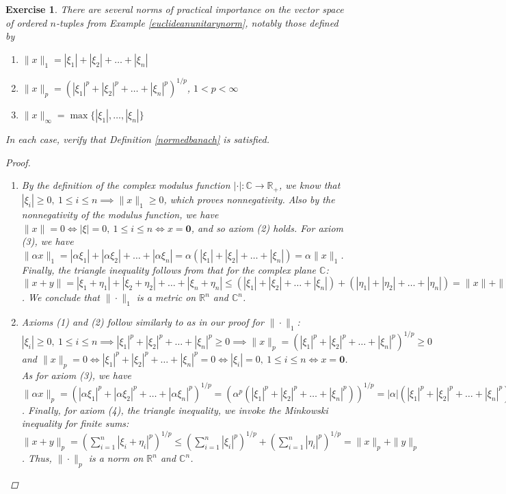 \documentclass[11pt]{article}
\theoremstyle{mystyle}
\newtheorem{protoexer}{Exercise}[section]
\newenvironment{exer}
{\colorlet{shadecolor}{blue!15}\begin{shaded}\begin{protoexer}}
{\end{protoexer}\end{shaded}}
\newcommand{\0}{\mathbf{0}}
\begin{document}
\begin{exer}\label{euclideannorms}
There are several norms of practical importance on the vector space of ordered $n$-tuples from Example \ref{euclideanunitarynorm}, notably those defined by
\begin{enumerate}
    \item $\|x\|_1 = |\xi_1| + |\xi_2| + \ldots + |\xi_n|$
    \item $\|x\|_p = (|\xi_1|^p + |\xi_2|^p + \ldots + |\xi_n|^p)^{1/p}$, \quad $1 < p < \infty$
    \item $\|x\|_{\infty} = \max\{|\xi_1|, \ldots, |\xi_n| \}$
\end{enumerate}
In each case, verify that Definition \ref{normedbanach} is satisfied.
\begin{proof}
\begin{enumerate}
    \item By the definition of the complex modulus function $| \cdot |: \mathbb{C} \longrightarrow \mathbb{R}_+$, we know that $|\xi_i| \geq 0, \ 1 \leq i \leq n \implies \| x\|_1 \geq 0$, which proves nonnegativity. Also by the nonnegativity of the modulus function, we have $\| x \| = 0 \iff  | \xi | = 0, \ 1 \leq i \leq n \iff x = \0$, and so axiom (2) holds. For axiom (3), we have $\| \alpha x \|_1 = |\alpha \xi_1| + |\alpha \xi_2| + \ldots + |\alpha \xi_n| = \alpha (|\xi_1| + |\xi_2| + \ldots + |\xi_n|) = \alpha \| x \|_1$. Finally, the triangle inequality follows from that for the complex plane $\mathbb{C}$: $\| x + y \| = |\xi_1 + \eta_1| + |\xi_2 + \eta_2| + \ldots + |\xi_n + \eta_n| \leq (|\xi_1| + |\xi_2| + \ldots + |\xi_n|) + (|\eta_1| + |\eta_2| + \ldots + |\eta_n|) = \|x\| + \|y\|$. We conclude that $\|\cdot\|_1$ is a metric on $\mathbb{R}^n$ and $\mathbb{C}^n$.
    \item Axioms (1) and (2) follow similarly to as in our proof for $\| \cdot \|_1$: $|\xi_i| \geq 0, \ 1 \leq i \leq n \implies |\xi_1|^p + |\xi_2|^p + \ldots + |\xi_n|^p \geq 0 \implies \|x\|_p = (|\xi_1|^p + |\xi_2|^p + \ldots + |\xi_n|^p)^{1/p} \geq 0$ and $\|x\|_p = 0 \iff |\xi_1|^p + |\xi_2|^p + \ldots + |\xi_n|^p = 0 \iff |\xi_i| = 0, \ 1 \leq i \leq n \iff x = \0$. As for axiom (3), we have $\| \alpha x \|_p = (| \alpha \xi_1|^p + | \alpha \xi_2|^p + \ldots + |\alpha \xi_n|^p)^{1/p} = (\alpha^p(|\xi_1|^p + |\xi_2|^p + \ldots + |\xi_n|^p))^{1/p} = |\alpha|(|\xi_1|^p + |\xi_2|^p + \ldots + |\xi_n|^p)^{1/p} = |\alpha| \| x\|_p$. Finally, for axiom (4), the triangle inequality, we invoke the Minkowski inequality for finite sums: $\| x + y \|_p = (\sum_{i=1}^n |\xi_i + \eta_i|^p)^{1/p} \leq (\sum_{i=1}^n |\xi_i|^p)^{1/p} + (\sum_{i=1}^n |\eta_i|^p)^{1/p} = \|x\|_p + \|y\|_p$. Thus, $\| \cdot \|_p$ is a norm on $\mathbb{R}^n$ and $\mathbb{C}^n$.

\end{enumerate}
\end{proof}
\end{exer}
\end{document}
